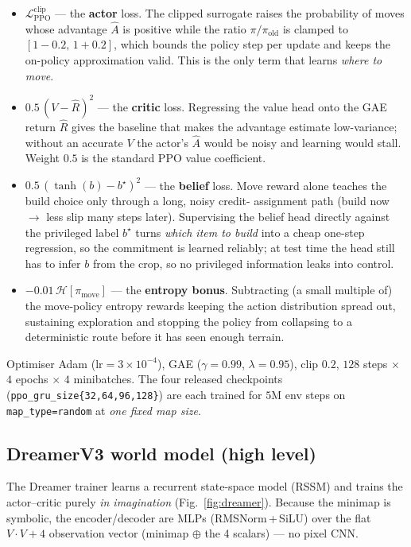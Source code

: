 \documentclass[11pt]{article}
\begin{document}
\begin{itemize}[leftmargin=1.4em, itemsep=1pt]
  \item $\mathcal{L}^{\text{clip}}_{\text{PPO}}$ --- the \textbf{actor} loss. The
        clipped surrogate raises the probability of moves whose advantage
        $\hat A$ is positive while the ratio $\pi/\pi_{\text{old}}$ is clamped to
        $[1{-}0.2,\,1{+}0.2]$, which bounds the policy step per update and keeps
        the on-policy approximation valid. This is the only term that learns
        \emph{where to move}.
  \item $0.5\,(V-\hat R)^2$ --- the \textbf{critic} loss. Regressing the value
        head onto the GAE return $\hat R$ gives the baseline that makes the
        advantage estimate low-variance; without an accurate $V$ the actor's
        $\hat A$ would be noisy and learning would stall. Weight $0.5$ is the
        standard PPO value coefficient.
  \item $0.5\,(\tanh(b)-b^\star)^2$ --- the \textbf{belief} loss. Move reward
        alone teaches the build choice only through a long, noisy credit-
        assignment path (build now $\to$ less slip many steps later). Supervising
        the belief head directly against the privileged label $b^\star$ turns
        \emph{which item to build} into a cheap one-step regression, so the
        commitment is learned reliably; at test time the head still has to infer
        $b$ from the crop, so no privileged information leaks into control.
  \item $-0.01\,\mathcal{H}[\pi_{\text{move}}]$ --- the \textbf{entropy bonus}.
        Subtracting (a small multiple of) the move-policy entropy rewards keeping
        the action distribution spread out, sustaining exploration and stopping
        the policy from collapsing to a deterministic route before it has seen
        enough terrain.
\end{itemize}
Optimiser Adam ($\text{lr}=3\!\times\!10^{-4}$), GAE ($\gamma=0.99$,
$\lambda=0.95$), clip $0.2$, $128$ steps $\times$ $4$ epochs $\times$ $4$
minibatches. The four released checkpoints
(\texttt{ppo\_gru\_size\{32,64,96,128\}}) are each trained for $5\mathrm{M}$ env
steps on \texttt{map\_type=random} at \emph{one fixed map size}.

\subsection{DreamerV3 world model (high level)}

The Dreamer trainer learns a recurrent state-space model (RSSM) and trains the
actor--critic purely \emph{in imagination} (Fig.~\ref{fig:dreamer}). Because the
minimap is symbolic, the encoder/decoder are MLPs (RMSNorm\,+\,SiLU) over the
flat $V{\cdot}V+4$ observation vector (minimap $\oplus$ the 4 scalars) --- no
pixel CNN.
\end{document}
